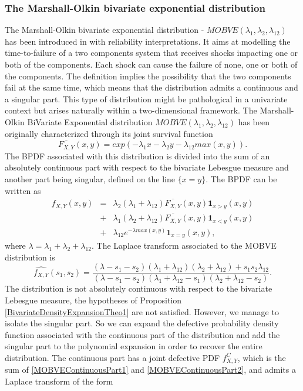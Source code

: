 \subsubsection{The Marshall-Olkin bivariate exponential distribution}
The Marshall-Olkin bivariate exponential distribution - $MOBVE(\lambda_{1},\lambda_{2},\lambda_{12})$ has been introduced in \citet{MaOl67} with reliability interpretations. It aims at modelling the time-to-failure of a two components system that receives shocks impacting one or both of the components. Each shock can cause the failure of none, one or both of the components. The definition implies the possibility that the two components fail at the same time, which means that the distribution admits a continuous and a singular part. This type of distribution might be pathological in a univariate context but arises naturally within a two-dimensional framework. The Marshall-Olkin BiVariate Exponential distribution $MOBVE(\lambda_{1},\lambda_{2},\lambda_{12})$ has been originally characterized through its joint survival function
\begin{equation}\label{MOBVEJointSurvival}
\overline{F_{X,Y}}(x,y)=exp(-\lambda_{1}x-\lambda_{2}y-\lambda_{12}max(x,y)).
\end{equation}
The BPDF associated with this distribution is divided into the sum of an absolutely continuous part with respect to the bivariate Lebesgue measure and another part being singular, defined on the line $\{x=y\}$. The BPDF can be written as
\begin{eqnarray}\label{MOBVEJointPDF}
f_{X,Y}(x,y)&=&\lambda_{2}(\lambda_{1}+\lambda_{12})\overline{F_{X,Y}}(x,y)\mathbf{1}_{x>y}(x,y)\label{MOBVEContinuousPart1}\\
&+&\lambda_{1}(\lambda_{2}+\lambda_{12})\overline{F_{X,Y}}(x,y)\mathbf{1}_{x<y}(x,y)\label{MOBVEContinuousPart2}\\
&+&\lambda_{12}e^{-\lambda max(x,y)}\mathbf{1}_{x=y}(x,y)\label{MOBVESingularPart},
\end{eqnarray}
where $\lambda=\lambda_{1}+\lambda_{2}+\lambda_{12}$. The Laplace transform associated to the  MOBVE distribution is 
\begin{equation}\label{MOBVELaplaceTransform}
\widehat{f_{X,Y}}(s_{1},s_{2})=\frac{(\lambda-s_{1}-s_{2})(\lambda_{1}+\lambda_{12})(\lambda_{2}+\lambda_{12})+s_{1}s_{2}\lambda_{12}}{(\lambda-s_{1}-s_{2})(\lambda_{1}+\lambda_{12}-s_{1})(\lambda_{2}+\lambda_{12}-s_{2})}.
\end{equation}
The distribution is not absolutely continuous with respect to the bivariate Lebesgue measure, the hypotheses of Proposition \ref{BivariateDensityExpansionTheo1} are not satisfied. However, we manage to isolate the singular part. So we can expand the defective probability density function associated with the continuous part of the distribution and add the singular part to the polynomial expansion in order to recover the entire distribution. The continuous part has a joint defective PDF $f_{X,Y}^{C}$, which is the sum of \eqref{MOBVEContinuousPart1} and \eqref{MOBVEContinuousPart2}, and admits a Laplace transform of the form
